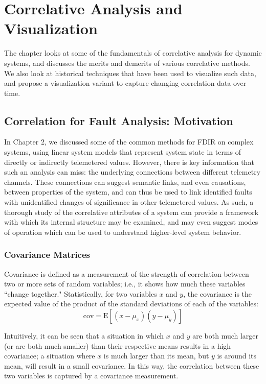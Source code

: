 \chapter{Correlative Analysis and Visualization}

The chapter looks at some of the fundamentals of correlative analysis for dynamic systems, and discusses the merits and demerits of various correlative methods. We also look at historical techniques that have been used to visualize such data, and propose a visualization variant to capture changing correlation data over time.

\section{Correlation for Fault Analysis: Motivation}

In Chapter 2, we discussed some of the common methods for FDIR on complex systems, using linear system models that represent system state in terms of directly or indirectly telemetered values. However, there is key information that such an analysis can miss: the underlying connections between different telemetry channels. These connections can suggest semantic links, and even causations, between properties of the system, and can thus be used to link identified faults with unidentified changes of significance in other telemetered values. As such, a thorough study of the correlative attributes of a system can provide a framework with which its internal structure may be examined, and may even suggest modes of operation which can be used to understand higher-level system behavior.

\subsection{Covariance Matrices}

Covariance is defined as a measurement of the strength of correlation between two or more sets of random variables; i.e., it shows how much these variables ``change together." Statistically, for two variables $x$ and $y$, the covariance is the expected value of the product of the standard deviations of each of the variables:
\begin{equation} \label{eq:cov}
\mathrm{cov} = \text{E}[(x - \mu_{x})(y - \mu_{y})]
\end{equation}

Intuitively, it can be seen that a situation in which $x$ and $y$ are both much larger (or are both much smaller) than their respective means results in a high covariance; a situation where $x$ is much larger than its mean, but $y$ is around its mean, will result in a small covariance. In this way, the correlation between these two variables is captured by a covariance measurement.

